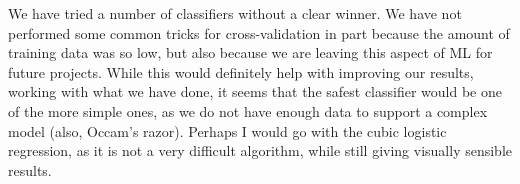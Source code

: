 \documentclass{article}
\begin{document}
We have tried a number of classifiers without a clear winner. 
We have not performed some common tricks for cross-validation in part because the amount of training data was so low, but also because we are leaving this aspect of ML for future projects. While this would definitely help with improving our results, working with what we have done, it seems that the safest classifier would be one of the more simple ones, as we do not have enough data to support a complex model (also, Occam's razor). Perhaps I would go with the cubic logistic regression, as it is not a very difficult algorithm, while still giving visually sensible results.
\end{document}
